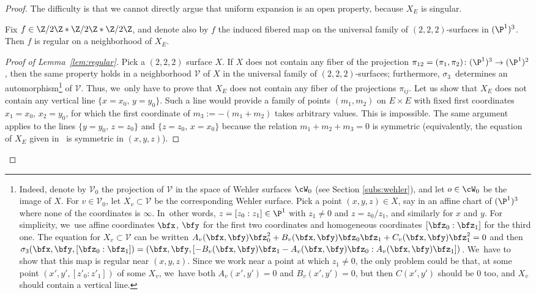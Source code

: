 \begin{proof}
The difficulty is that we cannot directly argue that uniform expansion is an open property, because
$X_E$ is singular.

\begin{lem}\label{lem:regular}
Fix $f\in \Z/2\Z\ast\Z/2\Z\ast\Z/2\Z$, and denote also by $f$ the induced fibered map on
the universal family of $(2,2,2)$-surfaces in $(\P^1)^3$.
Then $f$ is regular on a neighborhood of $X_E$.
\end{lem}

\begin{proof}[Proof of Lemma~\ref{lem:regular}] Pick a $(2,2,2)$ surface $X$. If $X$ does not contain any fiber
of the projection $\pi_{12}=(\pi_1,\pi_2)\colon (\P^1)^3\to (\P^1)^2$, then the same property holds in a neighborhood $\mathcal V$ of $X$ in the universal family of $(2,2,2)$-surfaces; furthermore, $\sigma_3$~determines an automorphism\footnote{Indeed,
denote by
${\mathcal{V}}_0$ the projection of $\mathcal V$ in the space of Wehler surfaces $ \cW_0$ (see Section \ref{subs:wehler}),
and let $o\in \cW_0$ be the image of $X$.
For $v\in {\mathcal{V}}_0$, let $X_v \subset {\mathcal V}$ be the corresponding Wehler surface.
Pick a point $(x,y,z)\in X$, say in an affine chart of $(\P^1)^3$ where none of the coordinates is $\infty$. In~other words, $z=[z_0:z_1]\in \P^1$ with $z_1\neq 0$ and $z=z_0/z_1$, and similarly for $x$ and $y$.
For simplicity, we~use affine coordinates $\bfx$, $\bfy$ for the first two coordinates and homogeneous coordinates $[\bfz_0:\bfz_1]$ for the third one. The equation for $X_v\subset \mathcal{V}$ can be written $A_v (\bfx,\bfy)\bfz_0^2+B_v(\bfx,\bfy)\bfz_0\bfz_1+C_v(\bfx,\bfy)\bfz_1^2=0$ and then $\sigma_3(\bfx, \bfy, [\bfz_0:\bfz_1])= (\bfx, \bfy, [-B_v(\bfx,\bfy) \bfz_1-A_v (\bfx, \bfy)\bfz_0 : A_v(\bfx,\bfy)\bfz_1])$. We~have to show that this map is regular near $(x,y,z)$. Since we work near a point at which $z_1\neq 0$, the only problem could be that, at some point $(x',y',[z'_0:z'_1])$ of some $X_v$, we~have both $A_v(x',y')=0$ and $B_v(x',y')=0$, but then $C(x',y')$ should be $0$ too, and $X_v$ should contain a vertical line.} of $\mathcal V$.
Thus, we~only have to prove that $X_E$ does not contain any fiber of the projections $\pi_{ij}$.
Let us show that $X_E$ does not contain any vertical line $\{x=x_0,\, y=y_0\}$. Such a line would provide a family of points $(m_1,m_2)$ on $E\times E$ with fixed first coordinates $x_1=x_0$, $x_2=y_0$, for which the first coordinate of $m_3:=-(m_1+m_2)$ takes arbitrary values. This is impossible. The same argument applies to the lines $\{y=y_0,\, z=z_0\}$ and $\{z=z_0,\, x=x_0\}$ because the relation $m_1+m_2+m_3=0$ is symmetric (equivalently, the equation of $X_E$ given in~\cite[\S 8.2]{Cantat:Panorama-Synthese} is symmetric in $(x,y,z)$).
\end{proof}


\end{proof}

